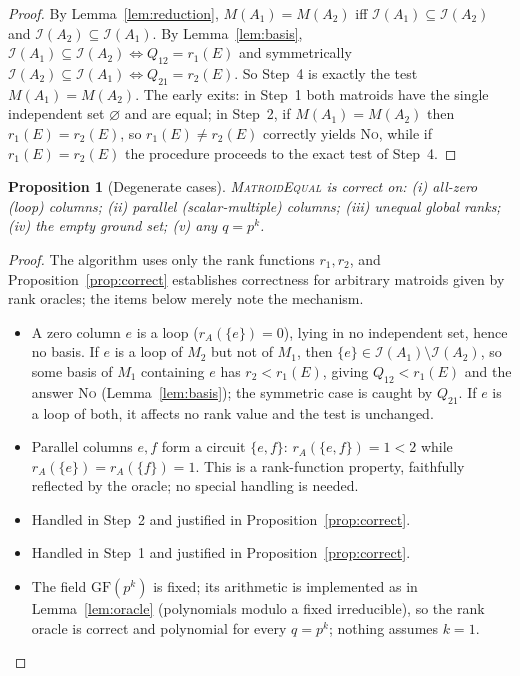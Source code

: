 \documentclass{amsart}
\theoremstyle{plain}
\newtheorem{proposition}{Proposition}
\theoremstyle{definition}
\newcommand{\I}{\mathcal{I}}
\begin{document}
\begin{proof}
By Lemma~\ref{lem:reduction}, $M(A_1)=M(A_2)$ iff $\I(A_1)\subseteq\I(A_2)$ and
$\I(A_2)\subseteq\I(A_1)$. By Lemma~\ref{lem:basis}, $\I(A_1)\subseteq\I(A_2)\iff Q_{12}=r_1(E)$
and symmetrically $\I(A_2)\subseteq\I(A_1)\iff Q_{21}=r_2(E)$. So Step~4 is exactly the test
$M(A_1)=M(A_2)$. The early exits: in Step~1 both matroids have the single independent set
$\varnothing$ and are equal; in Step~2, if $M(A_1)=M(A_2)$ then $r_1(E)=r_2(E)$, so
$r_1(E)\ne r_2(E)$ correctly yields \textsc{No}, while if $r_1(E)=r_2(E)$ the procedure proceeds
to the exact test of Step~4. \qedhere
\end{proof}

\begin{proposition}[Degenerate cases]\label{prop:degenerate}
\textsc{MatroidEqual} is correct on: (i) all-zero (loop) columns; (ii) parallel
(scalar-multiple) columns; (iii) unequal global ranks; (iv) the empty ground set; (v) any
$q=p^k$.
\end{proposition}

\begin{proof}
The algorithm uses only the rank functions $r_1,r_2$, and Proposition~\ref{prop:correct}
establishes correctness for arbitrary matroids given by rank oracles; the items below merely note
the mechanism.
\begin{itemize}
\item[(i)] A zero column $e$ is a loop ($r_A(\{e\})=0$), lying in no independent set, hence no
basis. If $e$ is a loop of $M_2$ but not of $M_1$, then $\{e\}\in\I(A_1)\setminus\I(A_2)$, so some
basis of $M_1$ containing $e$ has $r_2<r_1(E)$, giving $Q_{12}<r_1(E)$ and the answer \textsc{No}
(Lemma~\ref{lem:basis}); the symmetric case is caught by $Q_{21}$. If $e$ is a loop of both, it
affects no rank value and the test is unchanged.
\item[(ii)] Parallel columns $e,f$ form a circuit $\{e,f\}$: $r_A(\{e,f\})=1<2$ while
$r_A(\{e\})=r_A(\{f\})=1$. This is a rank-function property, faithfully reflected by the oracle;
no special handling is needed.
\item[(iii)] Handled in Step~2 and justified in Proposition~\ref{prop:correct}.
\item[(iv)] Handled in Step~1 and justified in Proposition~\ref{prop:correct}.
\item[(v)] The field $\mathrm{GF}(p^k)$ is fixed; its arithmetic is implemented as in
Lemma~\ref{lem:oracle} (polynomials modulo a fixed irreducible), so the rank oracle is correct and
polynomial for every $q=p^k$; nothing assumes $k=1$. \qedhere
\end{itemize}
\end{proof}
\end{document}
